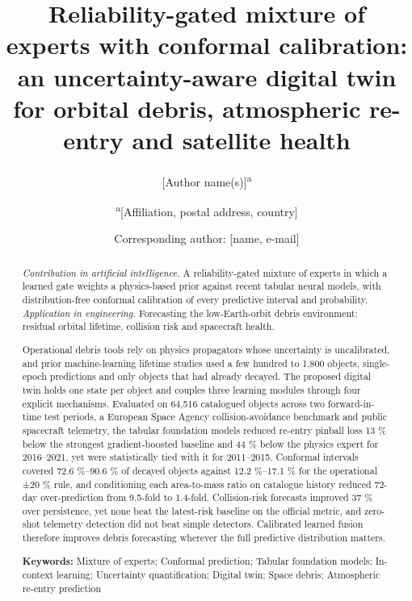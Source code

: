 \documentclass[3p,times,twocolumn]{elsarticle}
\begin{document}
\begin{frontmatter}

\title{Reliability-gated mixture of experts with conformal calibration:
an uncertainty-aware digital twin for orbital debris, atmospheric
re-entry and satellite health}

\author{{[}Author name(s){]}\textsuperscript{a}}
\author{\textsuperscript{a}{[}Affiliation, postal address, country{]}}
\author{Corresponding author: {[}name, e-mail{]}}

\begin{abstract}
\emph{Contribution in artificial intelligence.} A reliability-gated
mixture of experts in which a learned gate weights a physics-based prior
against recent tabular neural models, with distribution-free conformal
calibration of every predictive interval and probability.
\emph{Application in engineering.} Forecasting the low-Earth-orbit
debris environment: residual orbital lifetime, collision risk and
spacecraft health.

Operational debris tools rely on physics propagators whose uncertainty
is uncalibrated, and prior machine-learning lifetime studies used a few
hundred to 1,800 objects, single-epoch predictions and only objects that
had already decayed. The proposed digital twin holds one state per
object and couples three learning modules through four explicit
mechanisms. Evaluated on 64,516 catalogued objects across two
forward-in-time test periods, a European Space Agency
collision-avoidance benchmark and public spacecraft telemetry, the
tabular foundation models reduced re-entry pinball loss 13 \% below the
strongest gradient-boosted baseline and 44 \% below the physics expert
for 2016--2021, yet were statistically tied with it for 2011--2015.
Conformal intervals covered 72.6 \%--90.6 \% of decayed objects against
12.2 \%--17.1 \% for the operational ±20 \% rule, and conditioning each
area-to-mass ratio on catalogue history reduced 72-day over-prediction
from 9.5-fold to 1.4-fold. Collision-risk forecasts improved 37 \% over
persistence, yet none beat the latest-risk baseline on the official
metric, and zero-shot telemetry detection did not beat simple detectors.
Calibrated learned fusion therefore improves debris forecasting wherever
the full predictive distribution matters.

\textbf{Keywords:} Mixture of experts; Conformal prediction; Tabular
foundation models; In-context learning; Uncertainty quantification;
Digital twin; Space debris; Atmospheric re-entry prediction
\end{abstract}


\end{frontmatter}
\end{document}
